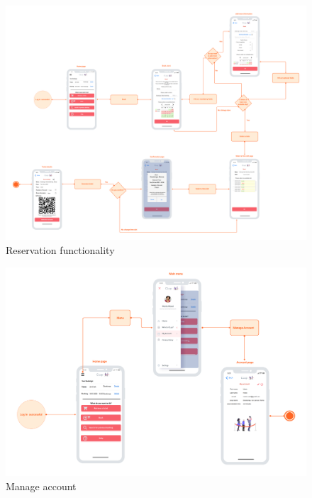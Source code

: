 \documentclass[table, 12pt]{article}
\begin{document}
\begin{center}
    \begin{figure}[H]
        \includegraphics[width=500pt]{assets/User-Interface-Design/book_a_visit_User.png}
        \caption{Reservation functionality}
    \end{figure}
\end{center}

\begin{center}
    \begin{figure}[H]
        \includegraphics[width=\textwidth]{assets/User-Interface-Design/account.png}
        \caption{Manage account}
    \end{figure}
\end{center}
\end{document}
